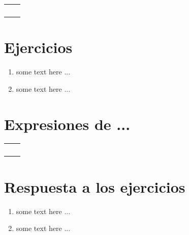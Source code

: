 \begin{tabular}{ l l }
	 &  \\
	 &  \\
	 &  \\
	 &
\end{tabular}

\Large{\section*{Ejercicios}}

\begin{enumerate}
	\item some text here ...
	\item some text here ...
\end{enumerate}

\Large{\section*{Expresiones de ...}}

\begin{tabular}{ l l }
	\bemph{} &  \\
	\bemph{} &  \\
	\bemph{} &  \\
	\bemph{} &  
\end{tabular}

\Large{\section*{Respuesta a los ejercicios}}

\begin{enumerate}
	\item some text here ... 
	\item some text here ...
\end{enumerate}

